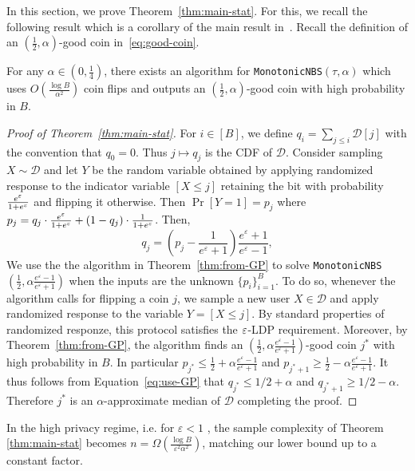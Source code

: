 In this section, we prove Theorem~\ref{thm:main-stat}. For this, we recall the following result which is a corollary of the main result in~\cite{gretta2023sharp}. 
Recall the definition of an $\left(\frac{1}{2}, \alpha\right)$-good coin in~\eqref{eq:good-coin}.
\begin{theorem}\label{thm:from-GP}
For any $\alpha \in \left(0,\frac{1}{4}\right)$, there exists an algorithm for \texttt{MonotonicNBS}$(\tau,\alpha)$ which uses $O(\frac{\log B}{\alpha^2})$ coin flips and outputs an $\left(\frac{1}{2},\alpha\right)$-good coin with high probability in $B$.
\end{theorem}
\begin{proof}[Proof of Theorem~\ref{thm:main-stat}]
For $i\in [B]$, we define $q_i=\sum_{j\leq i}\mathcal{D}[j]$ with the convention that $q_0=0$. 
Thus $j\mapsto q_j$ is the CDF of $\mathcal{D}$. Consider sampling $X\sim \mathcal{D}$ and let $Y$ be the random variable obtained by applying randomized response to the indicator variable $[X\leq j]$ retaining the bit with probability $\frac{e^\varepsilon}{1+e^\varepsilon}$ and flipping it otherwise. Then $\Pr[Y=1]=p_j$ where $p_j=q_j\cdot \frac{e^\varepsilon}{1+e^\varepsilon}+(1-q_j)\cdot \frac{1}{1+e^\varepsilon}$. Then,
\begin{equation}\label{eq:use-GP}
    q_{j} = \left(p_{j}-\frac{1}{e^\varepsilon+1}\right)\frac{e^\varepsilon+1}{e^\varepsilon-1},
\end{equation}
We use the the algorithm in Theorem~\ref{thm:from-GP} to solve \texttt{MonotonicNBS}$\left(\frac{1}{2},\alpha\frac{e^\varepsilon-1}{e^\varepsilon+1}\right)$ when the inputs are the unknown $\{p_i\}_{i=1}^B$. To do so, whenever the algorithm calls for flipping a coin $j$, we sample a new user $X\in \mathcal{D}$ and apply randomized response to the variable $Y=[X\leq j]$. By standard properties of randomized responze, this protocol satisfies the $\varepsilon$-LDP requirement. Moreover, by Theorem~\ref{thm:from-GP}, the algorithm finds an $\left(\frac{1}{2}, \alpha\frac{e^\varepsilon-1}{e^\varepsilon+1}\right)$-good coin $j^*$ with high probability in $B$. In particular $p_{j^*}\leq \frac{1}{2}+\alpha\frac{e^\varepsilon-1}{e^\varepsilon+1}$ and $p_{j^*+1}\geq \frac{1}{2}-\alpha\frac{e^\varepsilon-1}{e^\varepsilon+1}$. 
It thus follows from Equation~\eqref{eq:use-GP} that $q_{j^*}\leq 1/2+\alpha$ and $q_{j^*+1}\geq 1/2-\alpha$. Therefore $j^*$ is an $\alpha$-approximate median of $\mathcal{D}$ completing the proof.
\end{proof}
In the high privacy regime, i.e. for $\varepsilon<1$ , the sample complexity of Theorem \ref{thm:main-stat} becomes $n=\Omega\left(\frac{\log B}{\varepsilon
^2\alpha^2}\right)$, matching our lower bound up to a constant factor.